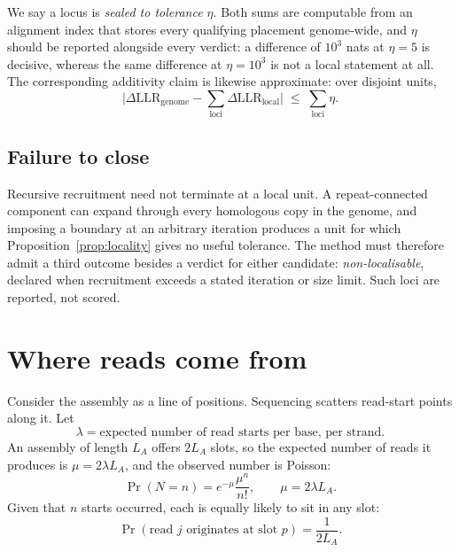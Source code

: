 \documentclass[11pt]{article}
\newcommand{\Prob}{\Pr}
\begin{document}
We say a locus is \emph{sealed to tolerance $\eta$}.  Both sums are computable
from an alignment index that stores every qualifying placement genome-wide, and
$\eta$ should be reported alongside every verdict: a difference of $10^3$ nats
at $\eta = 5$ is decisive, whereas the same difference at $\eta = 10^3$ is not
a local statement at all.  The corresponding additivity claim is likewise
approximate: over disjoint units,
\begin{equation}
    \Big|\Delta\mathrm{LLR}_{\text{genome}}
      - \sum_{\text{loci}} \Delta\mathrm{LLR}_{\text{local}}\Big|
    \;\le\; \sum_{\text{loci}} \eta .
\end{equation}

\subsection{Failure to close}

Recursive recruitment need not terminate at a local unit.  A repeat-connected
component can expand through every homologous copy in the genome, and imposing
a boundary at an arbitrary iteration produces a unit for which
Proposition~\ref{prop:locality} gives no useful tolerance.  The method must
therefore admit a third outcome besides a verdict for either candidate:
\emph{non-localisable}, declared when recruitment exceeds a stated iteration or
size limit.  Such loci are reported, not scored.

\section{Where reads come from}
\label{sec:origin}

Consider the assembly as a line of positions.  Sequencing scatters read-start
points along it.  Let
\begin{equation}
    \lambda = \text{expected number of read starts per base, per strand.}
\end{equation}
An assembly of length $L_A$ offers $2L_A$ slots, so the expected number of reads
it produces is $\mu = 2\lambda L_A$, and the observed number is Poisson:
\begin{equation}
    \Prob(N = n) = e^{-\mu}\frac{\mu^n}{n!}, \qquad \mu = 2\lambda L_A .
\end{equation}
Given that $n$ starts occurred, each is equally likely to sit in any slot:
\begin{equation}
    \Prob(\text{read } j \text{ originates at slot } p) = \frac{1}{2L_A}.
\end{equation}
\end{document}
